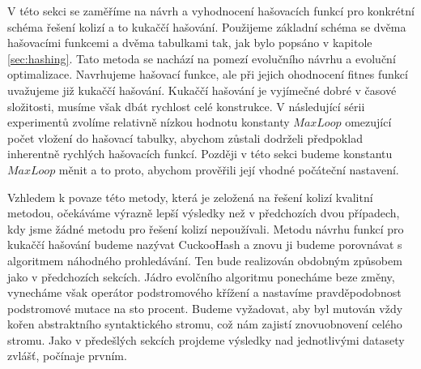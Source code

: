 V této sekci se zaměříme na návrh a vyhodnocení hašovacích funkcí pro konkrétní schéma řešení kolizí a to kukaččí hašování. Použijeme základní schéma
se dvěma hašovacími funkcemi a dvěma tabulkami tak, jak bylo popsáno v kapitole \ref{sec:hashing}. Tato metoda se nachází na pomezí
evolučního návrhu a evoluční optimalizace. Navrhujeme hašovací funkce, ale při jejich ohodnocení fitnes funkcí uvažujeme již kukaččí
hašování. Kukaččí hašování je vyjímečné dobré v časové složitosti, musíme však dbát rychlost celé konstrukce. V následující sérii 
experimentů zvolíme relativně nízkou hodnotu konstanty $MaxLoop$ omezující počet vložení do hašovací tabulky, abychom zůstali dodrželi
předpoklad inherentně rychlých hašovacích funkcí. Později v této sekci budeme konstantu $MaxLoop$ měnit a to proto, abychom prověřili
její vhodné počáteční nastavení. 

Vzhledem k povaze této metody, která je zeložená na řešení kolizí kvalitní metodou, očekáváme výrazně lepší výsledky než v předchozích dvou
případech, kdy jsme žádné metodu pro řešení kolizí nepoužívali. Metodu návrhu funkcí pro kukaččí hašování budeme nazývat CuckooHash a
znovu ji budeme porovnávat s algoritmem náhodného prohledávání. Ten bude realizován obdobným způsobem jako v předchozích sekcích. Jádro
evolčního algoritmu ponecháme beze změny, vynecháme však operátor podstromového křížení a nastavíme pravděpodobnost podstromové mutace
na sto procent. Budeme vyžadovat, aby byl mutován vždy kořen abstraktního syntaktického stromu, což nám zajistí znovuobnovení celého stromu.
Jako v předešlých sekcích projdeme výsledky nad jednotlivými datasety zvlášť, počínaje prvním.

